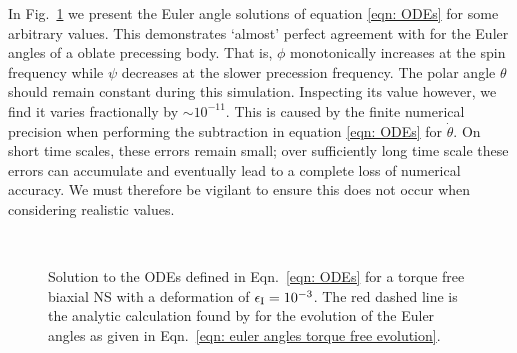 \documentclass[../full_thesis/full_thesis.tex]{subfiles}
\begin{document}
In Fig.~\ref{fig: biaxial body no torque} we present the Euler angle solutions
of equation \eqref{eqn: ODEs} for some arbitrary values.  This demonstrates
`almost' perfect agreement with \citet{Jones2001} for the Euler angles of a
oblate precessing body. That is, $\phi$ monotonically increases at the spin
frequency while $\psi$ decreases at the slower precession frequency. The polar
angle $\theta$ should remain constant during this simulation. Inspecting its
value however, we find it varies fractionally by $\sim 10^{-11}$.  This is
caused by the finite numerical precision when performing the subtraction in
equation \eqref{eqn: ODEs} for $\dot{\theta}$. On short time scales, these
errors remain small; over sufficiently long time scale these errors can
accumulate and eventually lead to a complete loss of numerical accuracy. We
must therefore be vigilant to ensure this does not occur when considering
realistic values.
\begin{figure}[htb]
    \centering
{} \\
\caption{Solution to the ODEs defined in Eqn.~\eqref{eqn: ODEs} for a
torque free biaxial NS with a deformation of $\epsilon_{\mathrm{I}} = 10^{-3}$. The red
dashed line is the analytic calculation found by \citet{Jones2001} for the
evolution of the Euler angles as given in Eqn.~\eqref{eqn: euler angles torque free evolution}.}
\label{fig: biaxial body no torque}
\end{figure}
\end{document}
